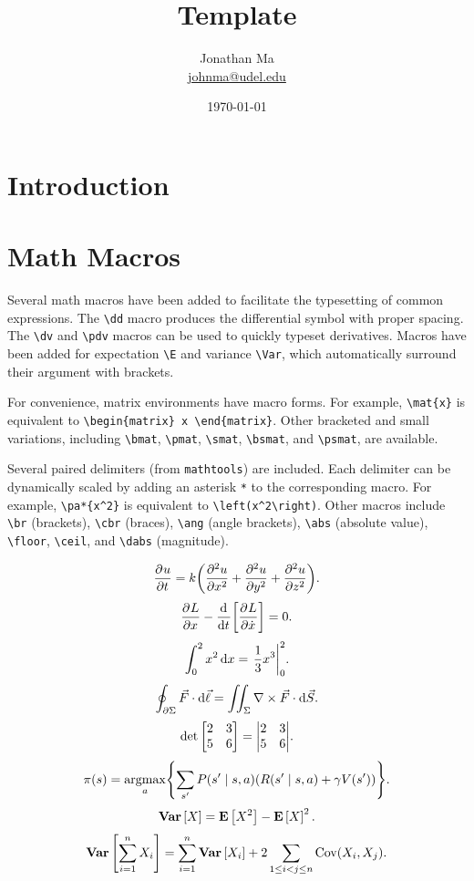 \documentclass[11pt]{article}
\title{Template}
\author{Jonathan Ma\\
\href{mailto:johnma@udel.edu}{johnma@udel.edu}}
\date{\today}
\begin{document}
\maketitle

\section{Introduction}
\label{sec:intro}

\section{Math Macros}
Several math macros have been added to facilitate the typesetting of common expressions. The \verb|\dd| macro produces the differential symbol with proper spacing. The \verb|\dv| and \verb|\pdv| macros can be used to quickly typeset derivatives. Macros have been added for expectation \verb|\E| and variance \verb|\Var|, which automatically surround their argument with brackets.

For convenience, matrix environments have macro forms. For example, \verb|\mat{x}| is equivalent to \verb|\begin{matrix} x \end{matrix}|. Other bracketed and small variations, including \verb|\bmat|, \verb|\pmat|, \verb|\smat|, \verb|\bsmat|, and \verb|\psmat|, are available.

Several paired delimiters (from \verb|mathtools|) are included. Each delimiter can be dynamically scaled by adding an asterisk \verb|*| to the corresponding macro. For example, \verb|\pa*{x^2}| is equivalent to \verb|\left(x^2\right)|. Other macros include \verb|\br| (brackets), \verb|\cbr| (braces), \verb|\ang| (angle brackets), \verb|\abs| (absolute value), \verb|\floor|, \verb|\ceil|, and \verb|\dabs| (magnitude).

\[ \pdv ut = k\pa*{\pdv[2] ux + \pdv[2] uy + \pdv[2] uz}. \]
\[ \pdv{L}{x} - \dv{}{t}\br*{\pdv{L}{\dot x}} = 0. \]
\[ \int_0^2 x^2 \dd x = \eval*{\frac 13 x^3}_0^2. \]
\[ \oint_{\partial\Sigma} \vec F \cdot \mathop{}\!\mathrm{d} \vec\ell = \iint_{\Sigma} \nabla \times \vec F \cdot \mathop{}\!\mathrm{d} \vec S. \]
\[ \det \bmat{2 & 3 \\ 5 & 6} = \abs*{\mat{2 & 3 \\ 5 & 6}}. \]
\[ \pi(s) = \argmax_a \cbr*{\sum_{s'} P(s' \mid s, a) (R(s' \mid s, a) + \gamma V(s'))}. \]
\[ \operatorname{\mathbf{Var}}\left[X\right] = \operatorname{\mathbf{E}}\left[X^2\right] - \operatorname{\mathbf{E}}\left[X\right]^2. \]
\[ \operatorname{\mathbf{Var}}\left[\sum_{i=1}^n X_i\right] = \sum_{i=1}^n \operatorname{\mathbf{Var}}\left[X_i\right] + 2\sum_{1 \leq i < j \leq n} \operatorname{Cov}(X_i, X_j). \]
\end{document}

